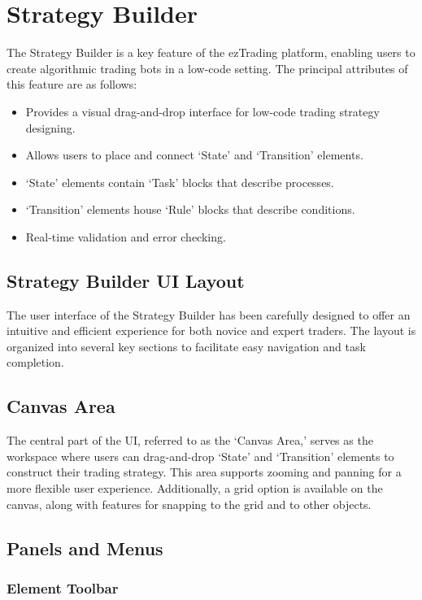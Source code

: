 

\section{Strategy Builder}

The Strategy Builder is a key feature of the ezTrading platform, enabling users to create algorithmic trading bots in a low-code setting. The principal attributes of this feature are as follows:
\begin{itemize}
    \item Provides a visual drag-and-drop interface for low-code trading strategy designing.
    \item Allows users to place and connect `State' and `Transition' elements.
    \item `State' elements contain `Task' blocks that describe processes.
    \item `Transition' elements house `Rule' blocks that describe conditions.
    \item Real-time validation and error checking.
\end{itemize}

\subsection{Strategy Builder UI Layout}

The user interface of the Strategy Builder has been carefully designed to offer an intuitive and efficient experience for both novice and expert traders. The layout is organized into several key sections to facilitate easy navigation and task completion.

\subsection{Canvas Area}

The central part of the UI, referred to as the `Canvas Area,' serves as the workspace where users can drag-and-drop `State' and `Transition' elements to construct their trading strategy. This area supports zooming and panning for a more flexible user experience. Additionally, a grid option is available on the canvas, along with features for snapping to the grid and to other objects.

\subsection{Panels and Menus}
\subsubsection{Element Toolbar}

